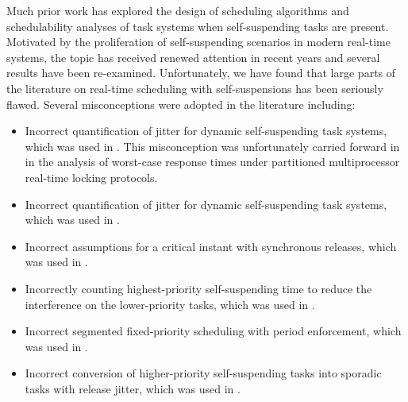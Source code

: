 Much prior work has explored the design of scheduling algorithms and schedulability analyses of task systems when self-suspending tasks are present. Motivated by the proliferation of self-suspending scenarios in modern real-time systems, the topic has received renewed attention in recent years and several results have been re-examined. Unfortunately, we have found that large parts of the literature on real-time scheduling with self-suspensions has been seriously flawed. Several misconceptions were adopted in the literature including: 
\begin{itemize}
\item Incorrect quantification of jitter for dynamic self-suspending
  task systems, which was used in
  \cite{ECRTS-AudsleyB04,RTAS-AudsleyB04,RTCSA-KimCPKH95,MingLiRTCSA1994}.  This
  misconception was unfortunately carried forward in \cite{zeng-2011,bbb-2013,yang-2013,kim-2014,han-2014,carminati-2014,yang-2014,lakshmanan-2009} in the analysis of worst-case response times under
  partitioned multiprocessor real-time locking protocols.
\item Incorrect quantification of jitter for dynamic self-suspending
  task systems, which was used in  \cite{RTCSA-BletsasA05}.
\item Incorrect assumptions for a critical instant with
  synchronous releases, which was used in \cite{LR:rtas10}.
\item Incorrectly counting highest-priority self-suspending time to reduce the
  interference on the lower-priority tasks, which was used in  \cite{RTSS-KimANR13}. 
\item Incorrect segmented fixed-priority scheduling with period
  enforcement, which was used in \cite{RTSS-KimANR13,DBLP:journals/ieicet/DingTT09}.
\item Incorrect conversion of higher-priority self-suspending tasks into sporadic tasks with release jitter, which was used in \cite{ecrts15nelissen}.
\end{itemize}


